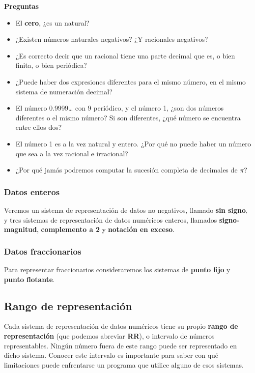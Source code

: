 \documentclass[spanish,A4,]{article}
\begin{document}
\textbf{Preguntas}

\begin{itemize}
\itemsep1pt\parskip0pt
\item
  El \textbf{cero}, ¿es un natural?
\item
  ¿Existen números naturales negativos? ¿Y racionales negativos?
\item
  ¿Es correcto decir que un racional tiene una parte decimal que es, o
  bien finita, o bien periódica?
\item
  ¿Puede haber dos expresiones diferentes para el mismo número, en el
  mismo sistema de numeración decimal?
\item
  El número 0.9999\ldots{} con 9 periódico, y el número 1, ¿son dos
  números diferentes o el mismo número? Si son diferentes, ¿qué número
  se encuentra entre ellos dos?
\item
  El número 1 es a la vez natural y entero. ¿Por qué no puede haber un
  número que sea a la vez racional e irracional?
\item
  ¿Por qué jamás podremos computar la sucesión completa de decimales de
  $\pi$?
\end{itemize}

\subsubsection{Datos enteros}\label{datos-enteros}

Veremos un sistema de representación de datos no negativos, llamado
\textbf{sin signo}, y tres sistemas de representación de datos numéricos
enteros, llamados \textbf{signo-magnitud}, \textbf{complemento a 2} y
\textbf{notación en exceso}.

\subsubsection{Datos fraccionarios}\label{datos-fraccionarios}

Para representar fraccionarios consideraremos los sistemas de
\textbf{punto fijo} y \textbf{punto flotante}.

\subsection{Rango de representación}\label{rango-de-representaciuxf3n}

Cada sistema de representación de datos numéricos tiene su propio
\textbf{rango de representación} (que podemos abreviar \textbf{RR}), o
intervalo de números representables. Ningún número fuera de este rango
puede ser representado en dicho sistema. Conocer este intervalo es
importante para saber con qué limitaciones puede enfrentarse un programa
que utilice alguno de esos sistemas.
\end{document}
